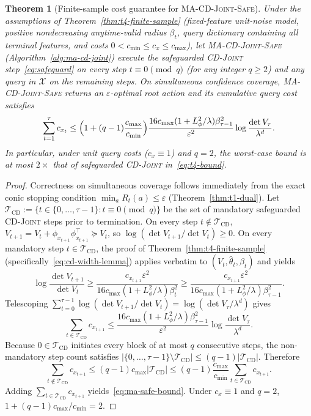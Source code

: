 \documentclass{article}
\theoremstyle{plain}
\newtheorem{theorem}{Theorem}[section]
\theoremstyle{definition}
\begin{document}
\begin{theorem}[Finite-sample cost guarantee for \textsc{MA-CD-Joint-Safe}]
\label{thm:ma-safe-termination}
Under the assumptions of Theorem~\ref{thm:t4-finite-sample} (fixed-feature unit-noise model, positive nondecreasing anytime-valid radius $\beta_t$, query dictionary containing all terminal features, and costs $0 < c_{\min} \le c_x \le c_{\max}$), let \textsc{MA-CD-Joint-Safe} (Algorithm~\ref{alg:ma-cd-joint}) execute the safeguarded \textsc{CD-Joint} step~\eqref{eq:safeguard} on every step $t \equiv 0 \pmod{q}$ (for any integer $q \ge 2$) and any query in $\mathcal{X}$ on the remaining steps. On simultaneous confidence coverage, \textsc{MA-CD-Joint-Safe} returns an $\varepsilon$-optimal root action and its cumulative query cost satisfies
\begin{equation}
  \sum_{t=1}^{\tau} c_{x_t}
  \le \Bigl(1 + (q - 1)\frac{c_{\max}}{c_{\min}}\Bigr)
      \frac{16 c_{\max}(1 + L_\phi^2/\lambda)\beta_{\tau - 1}^2}{\varepsilon^2}
      \log\frac{\det V_\tau}{\lambda^d}.
  \label{eq:ma-safe-bound}
\end{equation}
In particular, under unit query costs ($c_x \equiv 1$) and $q = 2$, the worst-case bound is at most $2\times$ that of safeguarded \textsc{CD-Joint} in~\eqref{eq:t4-bound}.
\end{theorem}

\begin{proof}
Correctness on simultaneous coverage follows immediately from the exact conic stopping condition $\min_a R_t(a) \le \varepsilon$ (Theorem~\ref{thm:t1-dual}). Let $\mathcal{T}_{\mathrm{CD}} := \{t \in \{0, \dots, \tau - 1\} : t \equiv 0 \pmod{q}\}$ be the set of mandatory safeguarded \textsc{CD-Joint} steps prior to termination. On every step $t \notin \mathcal{T}_{\mathrm{CD}}$, $V_{t+1} = V_t + \phi_{x_{t+1}}\phi_{x_{t+1}}^\top \succeq V_t$, so $\log(\det V_{t+1} / \det V_t) \ge 0$. On every mandatory step $t \in \mathcal{T}_{\mathrm{CD}}$, the proof of Theorem~\ref{thm:t4-finite-sample} (specifically~\eqref{eq:cd-width-lemma}) applies verbatim to $(V_t, \widehat\theta_t, \beta_t)$ and yields
\[
  \log\frac{\det V_{t+1}}{\det V_t}
  \ge \frac{c_{x_{t+1}}\varepsilon^2}{16 c_{\max}(1 + L_\phi^2/\lambda)\beta_t^2}
  \ge \frac{c_{x_{t+1}}\varepsilon^2}{16 c_{\max}(1 + L_\phi^2/\lambda)\beta_{\tau - 1}^2}.
\]
Telescoping $\sum_{t=0}^{\tau - 1} \log(\det V_{t+1} / \det V_t) = \log(\det V_\tau / \lambda^d)$ gives
\[
  \sum_{t \in \mathcal{T}_{\mathrm{CD}}} c_{x_{t+1}}
  \le \frac{16 c_{\max}(1 + L_\phi^2/\lambda)\beta_{\tau - 1}^2}{\varepsilon^2}
      \log\frac{\det V_\tau}{\lambda^d}.
\]
Because $0 \in \mathcal{T}_{\mathrm{CD}}$ initiates every block of at most $q$ consecutive steps, the non-mandatory step count satisfies $|\{0, \dots, \tau - 1\} \setminus \mathcal{T}_{\mathrm{CD}}| \le (q - 1)|\mathcal{T}_{\mathrm{CD}}|$. Therefore
\[
  \sum_{t \notin \mathcal{T}_{\mathrm{CD}}} c_{x_{t+1}}
  \le (q - 1)c_{\max}|\mathcal{T}_{\mathrm{CD}}|
  \le (q - 1)\frac{c_{\max}}{c_{\min}}\sum_{t \in \mathcal{T}_{\mathrm{CD}}} c_{x_{t+1}}.
\]
Adding $\sum_{t \in \mathcal{T}_{\mathrm{CD}}} c_{x_{t+1}}$ yields~\eqref{eq:ma-safe-bound}. Under $c_x \equiv 1$ and $q = 2$, $1 + (q - 1)c_{\max}/c_{\min} = 2$.
\end{proof}
\end{document}
